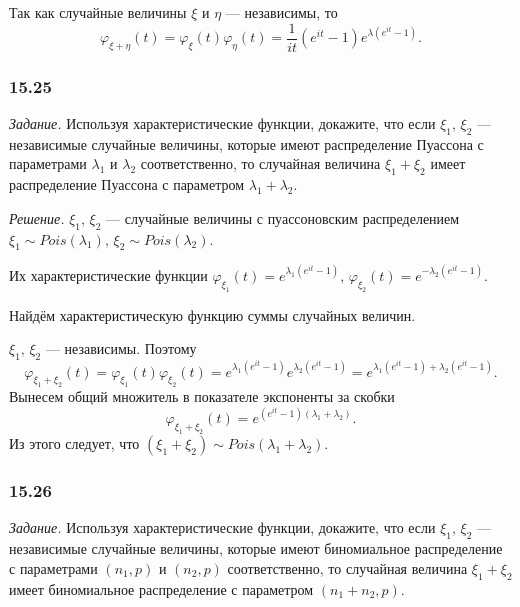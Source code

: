 Так как случайные величины $ \xi $ и $ \eta $ --- независимы, то
$$ \varphi_{ \xi + \eta } \left( t \right) =
\varphi_{ \xi } \left( t \right) \varphi_{ \eta } \left( t \right) =
\frac{1}{it} \left( e^{it} - 1 \right) e^{ \lambda \left( e^{it} - 1 \right) }.$$

\subsubsection*{15.25}

\textit{Задание.}
Используя характеристические функции, докажите, что если $ \xi_1, \, \xi_2$ --- независимые случайные величины,
которые имеют распределение Пуассона с параметрами $ \lambda_1$ и $ \lambda_2$ соответственно,
то случайная величина $ \xi_1 + \xi_2$ имеет распределение Пуассона с параметром $ \lambda_1 + \lambda_2$.

\textit{Решение.}
$ \xi_1, \, \xi_2$ --- случайные величины с пуассоновским распределением $ \xi_1 \sim Pois \left( \lambda_1 \right), \, \xi_2 \sim Pois \left( \lambda_2 \right) $.

Их характеристические функции
$ \varphi_{ \xi_1} \left( t \right) = e^{ \lambda_1 \left( e^{it} - 1 \right) }, \,
\varphi_{ \xi_2} \left( t \right) = e^{- \lambda_2 \left( e^{it} - 1 \right) }$.

Найдём характеристическую функцию суммы случайных величин.

$ \xi_1, \, \xi_2$ --- независимы.
Поэтому
$$ \varphi_{ \xi_1 + \xi_2} \left( t \right) =
\varphi_{ \xi_1} \left( t \right) \varphi_{ \xi_2} \left( t \right) =
e^{ \lambda_1 \left( e^{it} - 1 \right) } e^{ \lambda_2 \left( e^{it} - 1 \right) } =
e^{ \lambda_1 \left( e^{it} - 1 \right) + \lambda_2 \left( e^{it} - 1 \right) }.$$
Вынесем общий множитель в показателе экспоненты за скобки
$$ \varphi_{ \xi_1 + \xi_2} \left( t \right) =
e^{ \left( e^{it} - 1 \right) \left( \lambda_1 + \lambda_2 \right) }.$$
Из этого следует, что $ \left( \xi_1 + \xi_2 \right) \sim Pois \left( \lambda_1 + \lambda_2 \right) $.

\subsubsection*{15.26}

\textit{Задание.}
Используя характеристические функции, докажите, что если $ \xi_1, \, \xi_2$ --- независимые случайные величины,
которые имеют биномиальное распределение с параметрами $ \left( n_1, p \right) $ и $ \left( n_2, p \right) $ соответственно,
то случайная величина $ \xi_1 + \xi_2$ имеет биномиальное распределение с параметром $ \left( n_1 + n_2, p \right) $.


